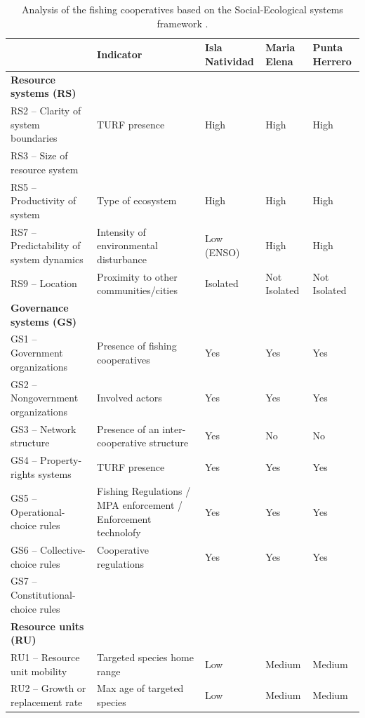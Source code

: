 \documentclass{frontiersSCNS}
\theoremstyle{definition}
\theoremstyle{definition}
\theoremstyle{definition}
\theoremstyle{remark}
\begin{document}
\begin{table}

\caption{\label{tab:unnamed-chunk-8}\label{table:gov_res}Analysis of the fishing cooperatives based on the Social-Ecological systems framework \citep{mcginnis_2014}.}
\centering
\begin{tabular}[t]{>{\raggedright\arraybackslash}p{10em}|>{\raggedright\arraybackslash}p{10em}|l|l|l}
\hline
 & Indicator & Isla Natividad & Maria Elena & Punta Herrero\\
\hline
\textbf{Resource systems (RS)} & \textbf{} & \textbf{} & \textbf{}\\
\hline
RS2 – Clarity of system boundaries & TURF presence & High & High & High\\
\hline
RS3 – Size of resource system &  &  &  & \\
\hline
RS5 – Productivity of system & Type of ecosystem & High & High & High\\
\hline
RS7 – Predictability of system dynamics & Intensity of environmental disturbance & Low (ENSO) & High & High\\
\hline
RS9 – Location & Proximity to other communities/cities & Isolated & Not Isolated & Not Isolated\\
\hline
\textbf{Governance systems (GS)} & \textbf{} & \textbf{} & \textbf{}\\
\hline
GS1 – Government organizations & Presence of fishing cooperatives & Yes & Yes & Yes\\
\hline
GS2 – Nongovernment organizations & Involved actors & Yes & Yes & Yes\\
\hline
GS3 – Network structure & Presence of an inter-cooperative structure & Yes & No & No\\
\hline
GS4 – Property-rights systems & TURF presence & Yes & Yes & Yes\\
\hline
GS5 – Operational-choice rules & Fishing Regulations / MPA enforcement / Enforcement technolofy & Yes & Yes & Yes\\
\hline
GS6 – Collective-choice rules & Cooperative regulations & Yes & Yes & Yes\\
\hline
GS7 – Constitutional-choice rules &  &  &  & \\
\hline
\textbf{Resource units (RU)} & \textbf{} & \textbf{} & \textbf{}\\
\hline
RU1 – Resource unit mobility & Targeted species home range & Low & Medium & Medium\\
\hline
RU2 – Growth or replacement rate & Max age of targeted species & Low & Medium & Medium\\

\end{tabular}
\end{table}
\end{document}
